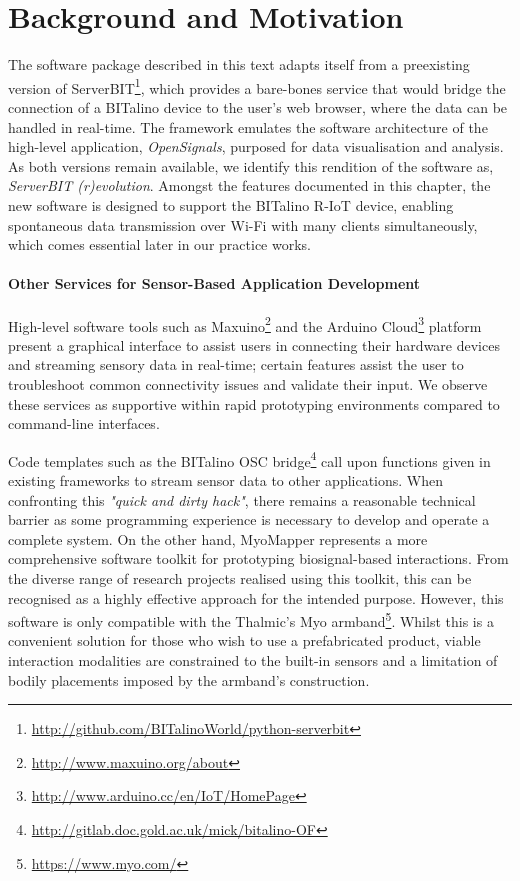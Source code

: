 \section{Background and Motivation}

The software package described in this text adapts itself from a preexisting version of ServerBIT\footnote{\url{http://github.com/BITalinoWorld/python-serverbit}}, which provides a bare-bones service that would bridge the connection of a BITalino device to the user’s web browser, where the data can be handled in real-time. The framework emulates the software architecture of the high-level application, \textit{OpenSignals}, purposed for data visualisation and analysis. As both versions remain available, we identify this rendition of the software as, \textit{ServerBIT (r)evolution}. Amongst the features documented in this chapter, the new software is designed to support the BITalino R-IoT device, enabling spontaneous data transmission over Wi-Fi with many clients simultaneously, which comes essential later in our practice works.  

\paragraph{Other Services for Sensor-Based Application Development} \label{services}
High-level software tools such as Maxuino\footnote[2]{\url{http://www.maxuino.org/about}} and the Arduino Cloud\footnote[3]{\url{http://www.arduino.cc/en/IoT/HomePage}} platform present a graphical interface to assist users in connecting their hardware devices and streaming sensory data in real-time; certain features assist the user to troubleshoot common connectivity issues and validate their input. We observe these services as supportive within rapid prototyping environments compared to command-line interfaces.

Code templates such as the BITalino OSC bridge\footnote[4]{\url{http://gitlab.doc.gold.ac.uk/mick/bitalino-OF}} call upon functions given in existing frameworks to stream sensor data to other applications. When confronting this \textit{"quick and dirty hack"}, there remains a reasonable technical barrier as some programming experience is necessary to develop and operate a complete system. On the other hand, MyoMapper\cite{donato_myo_nodate}  represents a more comprehensive software toolkit for prototyping biosignal-based interactions. From the diverse range of research projects realised using this toolkit\cite{brown_simple_2018,bullock_approaches_2016,di_donato_accessible_2019}, this can be recognised as a highly effective approach for the intended purpose. However, this software is only compatible with the Thalmic's Myo armband\footnote{\url{https://www.myo.com/}}. Whilst this is a convenient solution for those who wish to use a prefabricated product, viable interaction modalities are constrained to the built-in sensors and a limitation of bodily placements imposed by the armband's construction.

